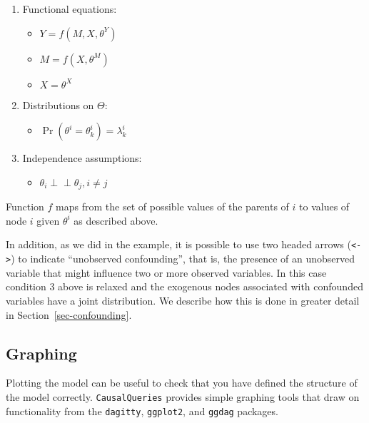 \documentclass[
  11pt,
  article]{jss}
\providecommand{\tightlist}{%
  \setlength{\itemsep}{0pt}\setlength{\parskip}{0pt}}\usepackage{longtable,booktabs,array}
\begin{document}
\begin{enumerate}
\def\labelenumi{\arabic{enumi}.}
\item
  Functional equations:

  \begin{itemize}
  \tightlist
  \item
    \(Y = f(M, X, \theta^Y)\)
  \item
    \(M = f(X, \theta^M)\)
  \item
    \(X = \theta^X\)
  \end{itemize}
\item
  Distributions on \(\Theta\):

  \begin{itemize}
  \tightlist
  \item
    \(\Pr(\theta^i = \theta^i_k) = \lambda^i_k\)
  \end{itemize}
\item
  Independence assumptions:

  \begin{itemize}
  \tightlist
  \item
    \(\theta_i \perp\!\!\! \perp \theta_j, i\neq j\)
  \end{itemize}
\end{enumerate}

Function \(f\) maps from the set of possible values of the parents of
\(i\) to values of node \(i\) given \(\theta^i\) as described above.

In addition, as we did in the \citet{chickering_clinicians_1996}
example, it is possible to use two headed arrows
(\texttt{\textless{}-\textgreater{}}) to indicate ``unobserved
confounding'', that is, the presence of an unobserved variable that
might influence two or more observed variables. In this case condition 3
above is relaxed and the exogenous nodes associated with confounded
variables have a joint distribution. We describe how this is done in
greater detail in Section~\ref{sec-confounding}.

\hypertarget{graphing}{%
\subsection{Graphing}\label{graphing}}

Plotting the model can be useful to check that you have defined the
structure of the model correctly. \texttt{CausalQueries} provides simple
graphing tools that draw on functionality from the \texttt{dagitty},
\texttt{ggplot2}, and \texttt{ggdag} packages.
\end{document}
